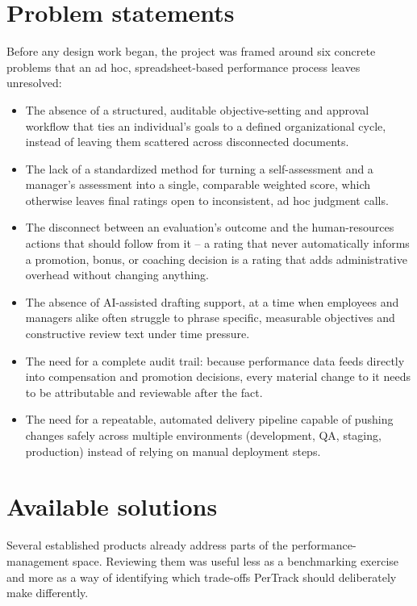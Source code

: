 \documentclass[12pt,a4paper]{report}
\begin{document}
\section{Problem statements}

Before any design work began, the project was framed around six concrete problems that an ad hoc, spreadsheet-based performance process leaves unresolved:

\begin{itemize}
    \item The absence of a structured, auditable objective-setting and approval workflow that ties an individual's goals to a defined organizational cycle, instead of leaving them scattered across disconnected documents.
    \item The lack of a standardized method for turning a self-assessment and a manager's assessment into a single, comparable weighted score, which otherwise leaves final ratings open to inconsistent, ad hoc judgment calls.
    \item The disconnect between an evaluation's outcome and the human-resources actions that should follow from it -- a rating that never automatically informs a promotion, bonus, or coaching decision is a rating that adds administrative overhead without changing anything.
    \item The absence of AI-assisted drafting support, at a time when employees and managers alike often struggle to phrase specific, measurable objectives and constructive review text under time pressure.
    \item The need for a complete audit trail: because performance data feeds directly into compensation and promotion decisions, every material change to it needs to be attributable and reviewable after the fact.
    \item The need for a repeatable, automated delivery pipeline capable of pushing changes safely across multiple environments (development, QA, staging, production) instead of relying on manual deployment steps.
\end{itemize}

\section{Available solutions}

Several established products already address parts of the performance-management space. Reviewing them was useful less as a benchmarking exercise and more as a way of identifying which trade-offs PerTrack should deliberately make differently.
\end{document}
